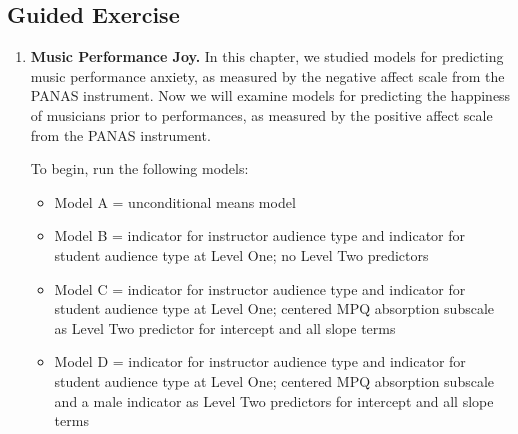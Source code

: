 \documentclass[
]{krantz}
\providecommand{\tightlist}{%
  \setlength{\itemsep}{0pt}\setlength{\parskip}{0pt}}
\begin{document}
\hypertarget{guided-exercise-1}{%
\subsection{Guided Exercise}\label{guided-exercise-1}}

\begin{enumerate}
\def\labelenumi{\arabic{enumi}.}
\item
  \textbf{Music Performance Joy.} In this chapter, we studied models for predicting music performance anxiety, as measured by the negative affect scale from the PANAS instrument. Now we will examine models for predicting the happiness of musicians prior to performances, as measured by the positive affect scale from the PANAS instrument.

  To begin, run the following models:

  \begin{itemize}
  \tightlist
  \item
    Model A = unconditional means model
  \item
    Model B = indicator for instructor audience type and indicator for student audience type at Level One;
    no Level Two predictors
  \item
    Model C = indicator for instructor audience type and indicator for student audience type at Level One;
    centered MPQ absorption subscale as Level Two predictor for intercept and all slope terms
  \item
    Model D = indicator for instructor audience type and indicator for student audience type at Level One;
    centered MPQ absorption subscale and a male indicator as Level Two predictors for intercept and all slope terms
  \end{itemize}


\end{enumerate}
\end{document}
